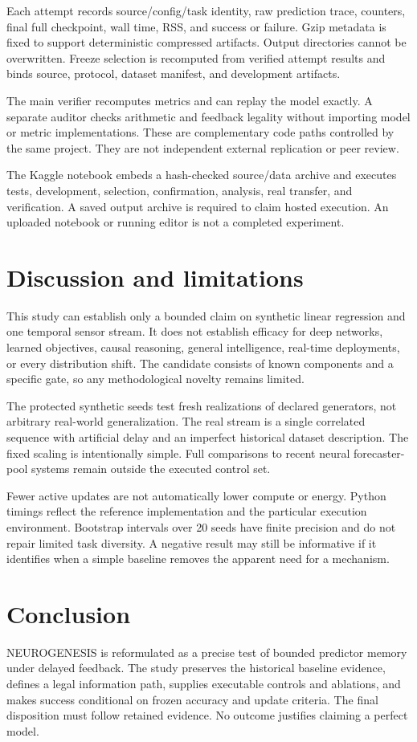 \documentclass[10pt]{article}
\begin{document}
Each attempt records source/config/task identity, raw prediction trace, counters, final full checkpoint, wall time, RSS, and success or failure. Gzip metadata is fixed to support deterministic compressed artifacts. Output directories cannot be overwritten. Freeze selection is recomputed from verified attempt results and binds source, protocol, dataset manifest, and development artifacts.

The main verifier recomputes metrics and can replay the model exactly. A separate auditor checks arithmetic and feedback legality without importing model or metric implementations. These are complementary code paths controlled by the same project. They are not independent external replication or peer review.

The Kaggle notebook embeds a hash-checked source/data archive and executes tests, development, selection, confirmation, analysis, real transfer, and verification. A saved output archive is required to claim hosted execution. An uploaded notebook or running editor is not a completed experiment.

\section{Discussion and limitations}
This study can establish only a bounded claim on synthetic linear regression and one temporal sensor stream. It does not establish efficacy for deep networks, learned objectives, causal reasoning, general intelligence, real-time deployments, or every distribution shift. The candidate consists of known components and a specific gate, so any methodological novelty remains limited.

The protected synthetic seeds test fresh realizations of declared generators, not arbitrary real-world generalization. The real stream is a single correlated sequence with artificial delay and an imperfect historical dataset description. The fixed scaling is intentionally simple. Full comparisons to recent neural forecaster-pool systems remain outside the executed control set.

Fewer active updates are not automatically lower compute or energy. Python timings reflect the reference implementation and the particular execution environment. Bootstrap intervals over 20 seeds have finite precision and do not repair limited task diversity. A negative result may still be informative if it identifies when a simple baseline removes the apparent need for a mechanism.

\section{Conclusion}
NEUROGENESIS is reformulated as a precise test of bounded predictor memory under delayed feedback. The study preserves the historical baseline evidence, defines a legal information path, supplies executable controls and ablations, and makes success conditional on frozen accuracy and update criteria. The final disposition must follow retained evidence. No outcome justifies claiming a perfect model.
\end{document}
